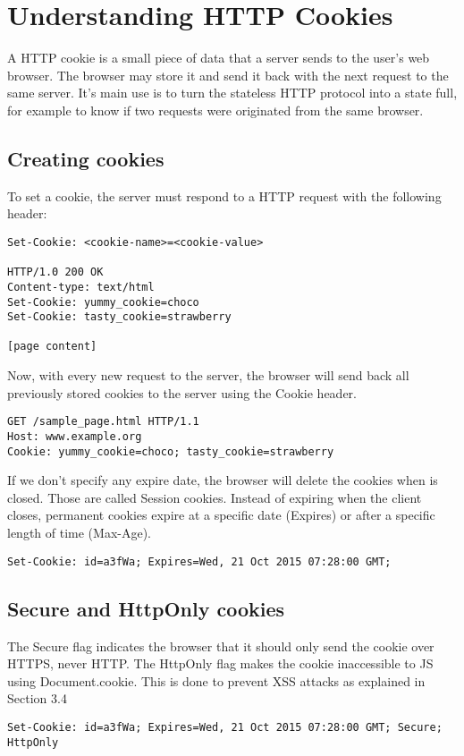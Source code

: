 \section{Understanding HTTP Cookies}
A HTTP cookie is a small piece of data that a server sends to the user's web browser. The browser may store it and send it back with the next request to the same server. It's main use is to turn the stateless HTTP protocol into a state full, for example to know if two requests were originated from the same browser. 

\subsection{Creating cookies}
To set a cookie, the server must respond to a HTTP request with the following header:
\begin{lstlisting}[style=verbs]
Set-Cookie: <cookie-name>=<cookie-value>

HTTP/1.0 200 OK
Content-type: text/html
Set-Cookie: yummy_cookie=choco
Set-Cookie: tasty_cookie=strawberry

[page content]
\end{lstlisting}
Now, with every new request to the server, the browser will send back all previously stored cookies to the server using the Cookie header.

\begin{lstlisting}[style=verbs]
GET /sample_page.html HTTP/1.1
Host: www.example.org
Cookie: yummy_cookie=choco; tasty_cookie=strawberry
\end{lstlisting}
If we don't specify any expire date, the browser will delete the cookies when is closed. Those are called Session cookies. Instead of expiring when the client closes, permanent cookies expire at a specific date (Expires) or after a specific length of time (Max-Age).
\begin{lstlisting}[style=verbs]
Set-Cookie: id=a3fWa; Expires=Wed, 21 Oct 2015 07:28:00 GMT;
\end{lstlisting}

\subsection{Secure and HttpOnly cookies}
The Secure flag indicates the browser that it should only send the cookie over HTTPS, never HTTP. The HttpOnly flag makes the cookie inaccessible to JS using Document.cookie. This is done to prevent XSS attacks as explained in Section 3.4
\begin{lstlisting}[style=verbs]
Set-Cookie: id=a3fWa; Expires=Wed, 21 Oct 2015 07:28:00 GMT; Secure; HttpOnly
\end{lstlisting}

